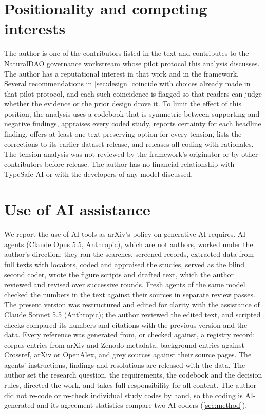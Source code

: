 \section*{Positionality and competing interests}
\label{sec:statements}
The author is one of the contributors listed in the \pol{} text and contributes to the NaturalDAO governance workstream whose pilot protocol this analysis discusses.
The author has a reputational interest in that work and in the framework.
Several recommendations in \cref{sec:design} coincide with choices already made in that pilot protocol, and each such coincidence is flagged so that readers can judge whether the evidence or the prior design drove it.
To limit the effect of this position, the analysis uses a codebook that is symmetric between supporting and negative findings, appraises every coded study, reports certainty for each headline finding, offers at least one text-preserving option for every tension, lists the corrections to its earlier dataset release, and releases all coding with rationales.
The tension analysis was not reviewed by the framework's originator or by other contributors before release.
The author has no financial relationship with TypeSafe AI or with the developers of any model discussed.

\section*{Use of AI assistance}
We report the use of AI tools as arXiv's policy on generative AI requires. AI agents (Claude Opus 5.5, Anthropic), which are not authors, worked under the author's direction: they ran the searches, screened records, extracted data from full texts with locators, coded and appraised the studies, served as the blind second coder, wrote the figure scripts and drafted text, which the author reviewed and revised over successive rounds. Fresh agents of the same model checked the numbers in the text against their sources in separate review passes.
The present version was restructured and edited for clarity with the assistance of Claude Sonnet 5.5 (Anthropic); the author reviewed the edited text, and scripted checks compared its numbers and citations with the previous version and the data.
Every reference was generated from, or checked against, a registry record: corpus entries from arXiv and Zenodo metadata, background entries against Crossref, arXiv or OpenAlex, and grey sources against their source pages.
The agents' instructions, findings and resolutions are released with the data.
The author set the research question, the requirements, the codebook and the decision rules, directed the work, and takes full responsibility for all content.
The author did not re-code or re-check individual study codes by hand, so the coding is AI-generated and its agreement statistics compare two AI coders (\cref{sec:method}).

